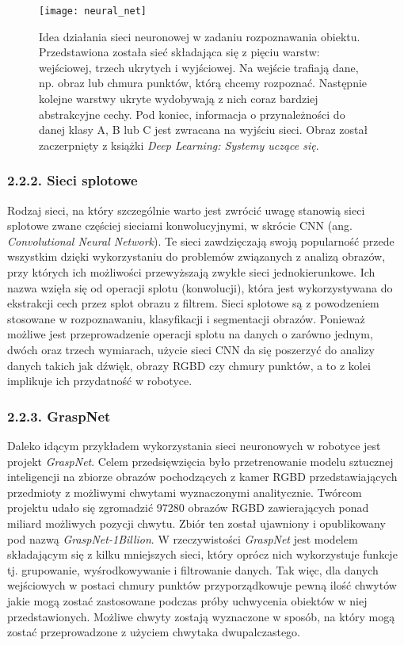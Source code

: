 \documentclass{article}
\begin{document}
\begin{figure}[h!]
\centering
\texttt{[image: neural\_net]}
\caption{Idea działania sieci neuronowej w zadaniu rozpoznawania obiektu. Przedstawiona została sieć składająca się z pięciu warstw: wejściowej, trzech ukrytych i wyjściowej. Na wejście trafiają dane, np. obraz lub chmura punktów, którą chcemy rozpoznać. Następnie kolejne warstwy ukryte wydobywają z nich coraz bardziej abstrakcyjne cechy. Pod koniec, informacja o przynależności do danej klasy A, B lub C jest zwracana na wyjściu sieci. Obraz został zaczerpnięty z książki \emph{Deep Learning: Systemy uczące się}.}
\end{figure}

\subsubsection*{\Large{2.2.2. Sieci splotowe}}
Rodzaj sieci, na który szczególnie warto jest zwrócić uwagę stanowią sieci splotowe zwane częściej sieciami konwolucyjnymi, w skrócie CNN (ang. \emph{Convolutional Neural Network}). Te sieci zawdzięczają swoją popularność przede wszystkim dzięki wykorzystaniu do problemów związanych z analizą obrazów, przy których ich możliwości przewyższają zwykłe sieci jednokierunkowe. Ich nazwa wzięła się od operacji splotu (konwolucji), która jest wykorzystywana do ekstrakcji cech przez splot obrazu z filtrem. Sieci splotowe są z powodzeniem stosowane w rozpoznawaniu, klasyfikacji i segmentacji obrazów. Ponieważ możliwe jest przeprowadzenie operacji splotu na danych o zarówno jednym, dwóch oraz trzech wymiarach, użycie sieci CNN da się poszerzyć do analizy danych takich jak dźwięk, obrazy RGBD czy chmury punktów, a to z kolei implikuje ich przydatność w robotyce.

\subsubsection*{\Large{2.2.3. GraspNet}}
Daleko idącym przykładem wykorzystania sieci neuronowych w robotyce jest projekt \emph{GraspNet}. Celem przedsięwzięcia było przetrenowanie modelu sztucznej inteligencji na zbiorze obrazów pochodzących z kamer RGBD przedstawiających przedmioty z możliwymi chwytami wyznaczonymi analitycznie. Twórcom projektu udało się zgromadzić 97280 obrazów RGBD zawierających ponad miliard możliwych pozycji chwytu. Zbiór ten został ujawniony i opublikowany pod nazwą \emph{GraspNet-1Billion}. W rzeczywistości \emph{GraspNet} jest modelem składającym się z kilku mniejszych sieci, który oprócz nich wykorzystuje funkcje tj. grupowanie, wyśrodkowywanie i filtrowanie danych. Tak więc, dla danych wejściowych w postaci chmury punktów przyporządkowuje pewną ilość chwytów jakie mogą zostać zastosowane podczas próby uchwycenia obiektów w niej przedstawionych. Możliwe chwyty zostają wyznaczone w sposób, na który mogą zostać przeprowadzone z użyciem chwytaka dwupalczastego.
\end{document}

